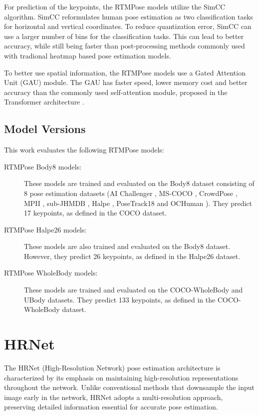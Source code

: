 For prediction of the keypoints, the RTMPose models utilize the SimCC \cite{simcc} algorithm. SimCC reformulates human pose estimation as two classification tasks for horizontal and vertical coordinates. To reduce quantization error, SimCC can use a larger number of bins for the classification tasks. This can lead to better accuracy, while still being faster than post-processing methods commonly used with tradional heatmap based pose estimation models.

To better use spatial information, the RTMPose models use a Gated Attention Unit (GAU) \cite{gau} module. The GAU has faster speed, lower memory cost and better accuracy than the commonly used self-attention module, proposed in the Transformer architecture \cite{attentionIsAllYouNeed}.

\subsection{Model Versions}
This work evaluates the following RTMPose models:

\begin{description}
    \item[RTMPose Body8 models:] These models are trained and evaluated on the Body8 dataset consisting of 8 pose estimation datasets (AI Challenger \cite{ai_challenger}, MS-COCO \cite{coco}, CrowdPose \cite{crowdpose}, MPII \cite{mpii}, sub-JHMDB \cite{JHMDB}, Halpe \cite{halpe}, PoseTrack18 \cite{posetrack} and OCHuman \cite{ochuman}). They predict 17 keypoints, as defined in the COCO dataset.
    \item[RTMPose Halpe26 models:] These models are also trained and evaluated on the Body8 dataset. However, they predict 26 keypoints, as defined in the Halpe26 dataset.
    \item[RTMPose WholeBody models:] These models are trained and evaluated on the COCO-WholeBody \cite{coco-wholebody} and UBody \cite{ubody} datasets. They predict 133 keypoints, as defined in the COCO-WholeBody dataset.
\end{description}




\section{HRNet}
\label{hrnet}

The HRNet (High-Resolution Network) \cite{hrnet} pose estimation architecture is characterized by its emphasis on maintaining high-resolution representations throughout the network. Unlike conventional methods that downsample the input image early in the network, HRNet adopts a multi-resolution approach, preserving detailed information essential for accurate pose estimation.

